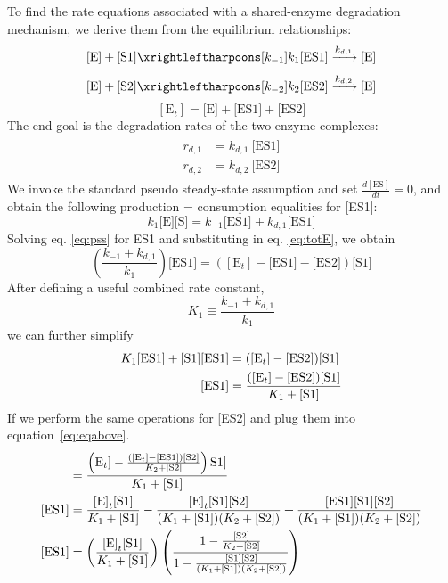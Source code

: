 To find the rate equations associated with a shared-enzyme degradation mechanism, we derive them from the equilibrium relationships:
\begin{equation*}
  \text{[E]} + \text{[S1]} \xrightleftharpoons[k_{-1}]{k_1} \text{[ES1]} \xrightarrow{k_{d,1}} \text{[E]}
\end{equation*}
\begin{equation*}
  \text{[E]} + \text{[S2]} \xrightleftharpoons[k_{-2}]{k_2}  \text{[ES2]} \xrightarrow{k_{d,2}} \text{[E]}
\end{equation*}
\begin{equation} \label{eq:totE}
  [\text{E}_t] = \text{[E]} + \text{[ES1]} + \text{[ES2]}
\end{equation}
The end goal is the degradation rates of the two enzyme complexes:
\begin{align}
  \begin{split}\label{eq:r1}
    r_{d,1} &= k_{d,1} \ \text{[ES1]}\\
    r_{d,2} &= k_{d,2} \ \text{[ES2]}
  \end{split}
\end{align}
We invoke the standard pseudo steady-state assumption and set $\frac{d[\text{ES}]}{dt}=0$, and obtain the following production = consumption equalities for [ES1]:
\begin{equation} \label{eq:pss}
  k_1\text{[E]}\text{[S]} = k_{-1}\text{[ES1]} + k_{d,1}\text{[ES1]}
\end{equation}
Solving eq. \ref{eq:pss} for ES1 and substituting in eq. \ref{eq:totE}, we obtain
\begin{equation*}
  \left(\frac{k_{-1}+k_{d,1}}{k_1}\right)\text{[ES1]} = \left([\text{E}_t] - \text{[ES1]} - \text{[ES2]}\right)\text{[S1]}
\end{equation*}
After defining a useful combined rate constant,
\begin{equation*}
  K_1 \equiv \frac{k_{-1}+k_{d,1}}{k_1}
\end{equation*}
we can further simplify
\begin{align}
  K_1 \text{[ES1]} + \text{[S1]}\text{[ES1]} &= ([\text{E}_t] - [\text{ES2}])[\text{S1}] \notag\\
  [\text{ES1}] &= \frac{([\text{E}_t] - [\text{ES2}])[\text{S1}]}{K_1 + [\text{S1}]} \label{eq:eqabove}
\end{align}
If we perform the same operations for [ES2] and plug them into equation~\ref{eq:eqabove}.
\begin{align}
  [\text{ES1}] &= \frac{\left(\text{E}_t] - \frac{([\text{E}_t] - [\text{ES1}])[\text{S2}]}{K_2 + [\text{S2}]}\right)\text{S1}]}{K_1 + [\text{S1}]} \notag\\
  [\text{ES1}] &= \frac{\text{[E]}_t \text{[S1]}}{K_1 + \text{[S1]}} - \frac{\text{[E]}_t \text{[S1]} \text{[S2]}}{(K_1 + \text{[S1]}) (K_2 + \text{[S2]})} + \frac{\text{[ES1]} \text{[S1]} \text{[S2]}}{(K_1 + \text{[S1]}) (K_2 + \text{[S2]})} \notag\\
  \label{eq:twofracs}
  [\text{ES1}] &= \left(\frac{\text{[E]}_t \text{[S1]}}{K_1 + \text{[S1]}}\right) \left(\frac{1 - \frac{\text{[S2]}}{K_2 + \text{[S2]}}}{1 - \frac{\text{[S1]} \text{[S2]}}{(K_1 + \text{[S1]}) (K_2 + \text{[S2]})}}\right)
\end{align}
